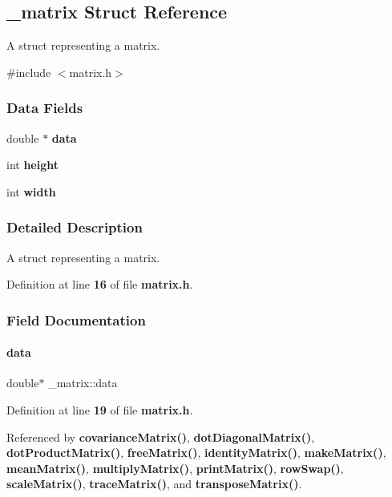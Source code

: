 \subsection{\+\_\+matrix Struct Reference}
\label{struct__matrix}


A struct representing a matrix.  




{\ttfamily \#include $<$matrix.\+h$>$}

\subsubsection*{Data Fields}
\begin{DoxyCompactItemize}
\item 
double $\ast$ \textbf{ data}
\item 
int \textbf{ height}
\item 
int \textbf{ width}
\end{DoxyCompactItemize}


\subsubsection{Detailed Description}
A struct representing a matrix. 

Definition at line \textbf{ 16} of file \textbf{ matrix.\+h}.



\subsubsection{Field Documentation}
\mbox{\label{struct__matrix_ad3fdadaa9e22623d5830e37663d500be}} 
\paragraph{data}
{\footnotesize\ttfamily double$\ast$ \+\_\+matrix\+::data}



Definition at line \textbf{ 19} of file \textbf{ matrix.\+h}.



Referenced by \textbf{ covariance\+Matrix()}, \textbf{ dot\+Diagonal\+Matrix()}, \textbf{ dot\+Product\+Matrix()}, \textbf{ free\+Matrix()}, \textbf{ identity\+Matrix()}, \textbf{ make\+Matrix()}, \textbf{ mean\+Matrix()}, \textbf{ multiply\+Matrix()}, \textbf{ print\+Matrix()}, \textbf{ row\+Swap()}, \textbf{ scale\+Matrix()}, \textbf{ trace\+Matrix()}, and \textbf{ transpose\+Matrix()}.

